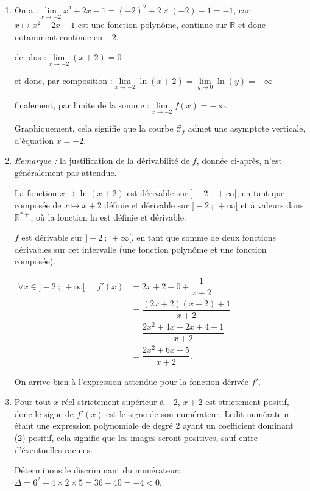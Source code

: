 \documentclass[10pt]{article}
\providecommand{\R}{\mathbb{R}}
\begin{document}
\begin{enumerate}
\item On a :\quad $\lim\limits_{x \to -2} x^2 + 2x - 1 = (-2)^2 + 2\times (-2) - 1 = -1$, \quad car $x\longmapsto x^2 + 2x - 1$ est une fonction polynôme, continue sur $\R$ et donc notamment continue en $-2$.

de plus :\quad $\lim\limits_{x \to -2} (x + 2) = 0$

et donc, par composition :\quad $\lim\limits_{x \to -2}\ln(x+2) = \lim\limits_{y \to 0} \ln(y) = -\infty$

finalement, par limite de la somme :\quad $\lim\limits_{x \to -2}f(x) = -\infty$.

Graphiquement, cela signifie que la courbe $\mathcal{C}_f$ admet une asymptote verticale, d'équation $x = -2$.

\item \emph{Remarque :} la justification de la dérivabilité de $f$, donnée ci-après, n'est généralement pas attendue.

\smallskip

La fonction $x \longmapsto \ln(x+2)$ est dérivable sur $]-2~;~+\infty[$, en tant que composée de $x \longmapsto x+2$ définie et dérivable sur $]-2~;~+\infty[$ et à valeurs dans $\R^{*+}$, où la fonction ln est définie et dérivable.

$f$ est dérivable sur $]-2~;~+\infty[$, en tant que somme de deux fonctions dérivables sur cet intervalle (une fonction polynôme et une fonction composée).

$\begin{aligned} \forall x \in ]-2~;~+\infty[,\quad f'(x)&=2x + 2 + 0 + \dfrac{1}{x+2}\\
&=\dfrac{(2x + 2)(x+2) + 1}{x+2}\\
&=\dfrac{2x^2 + 4x + 2x + 4 + 1}{x+2}\\
&=\dfrac{2 x^{2} + 6x + 5}{x + 2}.\end{aligned}$

On arrive bien à l'expression attendue pour la fonction dérivée $f'$.
\item Pour tout $x$ réel strictement supérieur à $-2$, $x + 2$ est strictement positif, donc le signe de $f'(x)$ est le signe de son numérateur. Ledit numérateur étant une expression polynomiale de degré 2 ayant un coefficient dominant (2) positif, cela signifie que les images seront positives, sauf entre d'éventuelles racines.

Déterminons le discriminant du numérateur: \quad $\Delta = 6^2 - 4\times 2 \times 5 = 36 - 40 = -4 <0$.


\end{enumerate}
\end{document}
